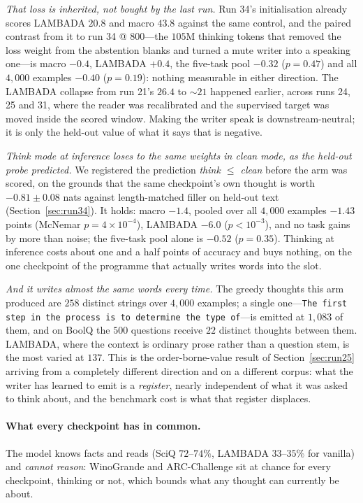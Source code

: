 \documentclass{article} %
\begin{document}
\emph{That loss is inherited, not bought by the last run.} Run 34's initialisation already scores LAMBADA $20.8$ and macro $43.8$ against the same control, and the paired contrast from it to run 34 @ $800$---the $105$M thinking tokens that removed the loss weight from the abstention blanks and turned a mute writer into a speaking one---is macro $-0.4$, LAMBADA $+0.4$, the five-task pool $-0.32$ ($p = 0.47$) and all $4{,}000$ examples $-0.40$ ($p = 0.19$): nothing measurable in either direction. The LAMBADA collapse from run 21's $26.4$ to ${\sim}21$ happened earlier, across runs 24, 25 and 31, where the reader was recalibrated and the supervised target was moved inside the scored window. Making the writer speak is downstream-neutral; it is only the held-out value of what it says that is negative.

\emph{Think mode at inference loses to the same weights in clean mode, as the held-out probe predicted.} We registered the prediction \emph{think $\le$ clean} before the arm was scored, on the grounds that the same checkpoint's own thought is worth $-0.81 \pm 0.08$ nats against length-matched filler on held-out text (Section~\ref{sec:run34}). It holds: macro $-1.4$, pooled over all $4{,}000$ examples $-1.43$ points (McNemar $p = 4 \times 10^{-4}$), LAMBADA $-6.0$ ($p < 10^{-3}$), and no task gains by more than noise; the five-task pool alone is $-0.52$ ($p = 0.35$). Thinking at inference costs about one and a half points of accuracy and buys nothing, on the one checkpoint of the programme that actually writes words into the slot.

\emph{And it writes almost the same words every time.} The greedy thoughts this arm produced are $258$ distinct strings over $4{,}000$ examples; a single one---\texttt{The first step in the process is to determine the type of}---is emitted at $1{,}083$ of them, and on BoolQ the $500$ questions receive $22$ distinct thoughts between them. LAMBADA, where the context is ordinary prose rather than a question stem, is the most varied at $137$. This is the order-borne-value result of Section~\ref{sec:run25} arriving from a completely different direction and on a different corpus: what the writer has learned to emit is a \emph{register}, nearly independent of what it was asked to think about, and the benchmark cost is what that register displaces.

\paragraph{What every checkpoint has in common.} The model knows facts and reads (SciQ $72$--$74\%$, LAMBADA $33$--$35\%$ for vanilla) and \emph{cannot reason}: WinoGrande and ARC-Challenge sit at chance for every checkpoint, thinking or not, which bounds what any thought can currently be about.
\end{document}
